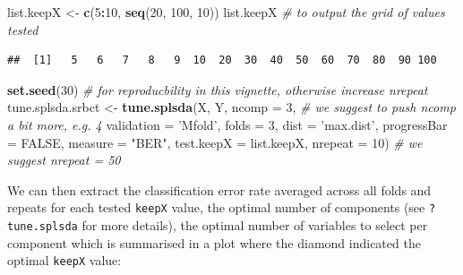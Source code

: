 \documentclass[]{book}
\newenvironment{Shaded}{\begin{snugshade}}{\end{snugshade}}
\newcommand{\CommentTok}[1]{\textcolor[rgb]{0.56,0.35,0.01}{\textit{#1}}}
\newcommand{\DataTypeTok}[1]{\textcolor[rgb]{0.13,0.29,0.53}{#1}}
\newcommand{\DecValTok}[1]{\textcolor[rgb]{0.00,0.00,0.81}{#1}}
\newcommand{\KeywordTok}[1]{\textcolor[rgb]{0.13,0.29,0.53}{\textbf{#1}}}
\newcommand{\NormalTok}[1]{#1}
\newcommand{\OperatorTok}[1]{\textcolor[rgb]{0.81,0.36,0.00}{\textbf{#1}}}
\newcommand{\OtherTok}[1]{\textcolor[rgb]{0.56,0.35,0.01}{#1}}
\newcommand{\StringTok}[1]{\textcolor[rgb]{0.31,0.60,0.02}{#1}}
\begin{document}
\begin{Shaded}
\begin{Highlighting}[]
\NormalTok{list.keepX <-}\StringTok{ }\KeywordTok{c}\NormalTok{(}\DecValTok{5}\OperatorTok{:}\DecValTok{10}\NormalTok{,  }\KeywordTok{seq}\NormalTok{(}\DecValTok{20}\NormalTok{, }\DecValTok{100}\NormalTok{, }\DecValTok{10}\NormalTok{))}
\NormalTok{list.keepX }\CommentTok{# to output the grid of values tested}
\end{Highlighting}
\end{Shaded}

\begin{verbatim}
##  [1]   5   6   7   8   9  10  20  30  40  50  60  70  80  90 100
\end{verbatim}

\begin{Shaded}
\begin{Highlighting}[]
\KeywordTok{set.seed}\NormalTok{(}\DecValTok{30}\NormalTok{) }\CommentTok{# for reproducbility in this vignette, otherwise increase nrepeat}
\NormalTok{tune.splsda.srbct <-}\StringTok{ }\KeywordTok{tune.splsda}\NormalTok{(X, Y, }\DataTypeTok{ncomp =} \DecValTok{3}\NormalTok{, }\CommentTok{# we suggest to push ncomp a bit more, e.g. 4}
                                 \DataTypeTok{validation =} \StringTok{'Mfold'}\NormalTok{,}
                                 \DataTypeTok{folds =} \DecValTok{3}\NormalTok{, }\DataTypeTok{dist =} \StringTok{'max.dist'}\NormalTok{, }\DataTypeTok{progressBar =} \OtherTok{FALSE}\NormalTok{,}
                                 \DataTypeTok{measure =} \StringTok{"BER"}\NormalTok{, }\DataTypeTok{test.keepX =}\NormalTok{ list.keepX,}
                                 \DataTypeTok{nrepeat =} \DecValTok{10}\NormalTok{)   }\CommentTok{# we suggest nrepeat = 50}
\end{Highlighting}
\end{Shaded}

We can then extract the classification error rate averaged across all folds and repeats for each tested \texttt{keepX} value, the optimal number of components (see \texttt{?tune.splsda} for more details), the optimal number of variables to select per component which is summarised in a plot where the diamond indicated the optimal \texttt{keepX} value:

\begin{Shaded}
\end{Shaded}
\end{document}
